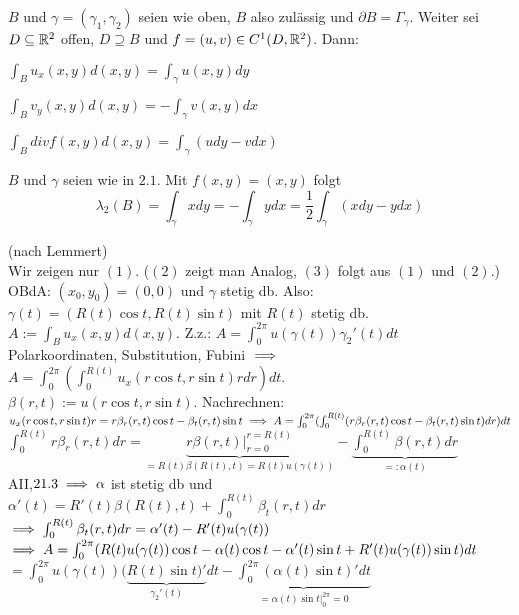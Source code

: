\documentclass[a4paper,twoside,DIV15,BCOR12mm]{scrbook}
\begin{document}
\begin{satz}
$B$ und $\gamma = (\gamma_1,\gamma_2)$ seien wie oben, $B$ also zulässig und $\partial B = \Gamma_\gamma$. Weiter sei $D \subseteq \mathbb{R}^2$ offen, $D \supseteq B$ und $f = (u,v) \in C^1(D,\mathbb{R}^2)$.
Dann:
\begin{liste}
\item $\int_B u_x(x,y)d(x,y) = \int_\gamma u(x,y)dy$
\item $\int_B v_y(x,y)d(x,y) = -\int_\gamma v(x,y)dx$
\item $\int_B div f(x,y)d(x,y) = \int_\gamma (udy-vdx)$
\end{liste}
\end{satz}
\begin{anwendung}
$B$ und $\gamma$ seien wie in $2.1$. Mit $f(x,y)=(x,y)$ folgt $$\lambda_2(B) = \int_\gamma xdy = -\int_\gamma ydx = \frac{1}{2} \int_\gamma(xdy-ydx)$$
\end{anwendung}
\begin{beweis}
(nach Lemmert)\\
Wir zeigen nur $(1)$. ($(2)$ zeigt man Analog, $(3)$ folgt aus $(1)$ und $(2)$.)\\
OBdA: $(x_0,y_0)=(0,0)$ und $\gamma$ stetig db. Also: $\gamma(t)=(R(t)\cos{t},R(t)\sin{t})$ mit $R(t)$ stetig db.\\
$A:=\int_B u_x(x,y)d(x,y)$. Z.z.: $A=\int_0^{2\pi}u(\gamma(t))\gamma_2'(t)dt$\\
Polarkoordinaten, Substitution, Fubini $\implies$ $A=\int^{2\pi}_0(\int^{R(t)}_0 u_x(r \cos{t},r \sin{t})r dr)dt$.\\
$\beta(r,t):=u(r \cos{t}, r \sin{t})$. Nachrechnen: $u_x(r \cos{t},r \sin{t})r=r\beta_r(r,t)\cos{t}-\beta_t(r,t)\sin{t} \implies A=\int_0^{2\pi}(\int_0^{R(t)}(r\beta_r(r,t)\cos{t}-\beta_t(r,t)\sin{t})dr)dt$\\
$\int_0^{R(t)}r\beta_r(r,t)dr=\underbrace{r\beta(r,t)|_{r=0}^{r=R(t)}}_{=R(t)\beta(R(t),t)=R(t)u(\gamma(t))} - \underbrace{\int_0^{R(t)}\beta(r,t)dr}_{=:\alpha(t)}$\\
AII,$21.3\implies \alpha$ ist stetig db und $\alpha'(t)=R'(t)\beta(R(t),t)+\int_0^{R(t)}\beta_t(r,t)dr$ \\
$\implies \int_0^{R(t)}\beta_t(r,t)dr=\alpha'(t)-R'(t)u(\gamma(t))$\\
$\implies A=\int_0^{2\pi}(R(t)u(\gamma(t))\cos{t}-\alpha(t)\cos{t}-\alpha'(t)\sin{t}+R'(t)u(\gamma(t))\sin{t})dt$\\
$=\int_0^{2\pi}u(\gamma(t))(\underbrace{R(t)\sin{t})'}_{\gamma_2'(t)}dt-\underbrace{\int_0^{2\pi}(\alpha(t)\sin{t})'dt}_{=\alpha(t)\sin{t}|_0^{2\pi}=0}$
\end{beweis}
\end{document}

